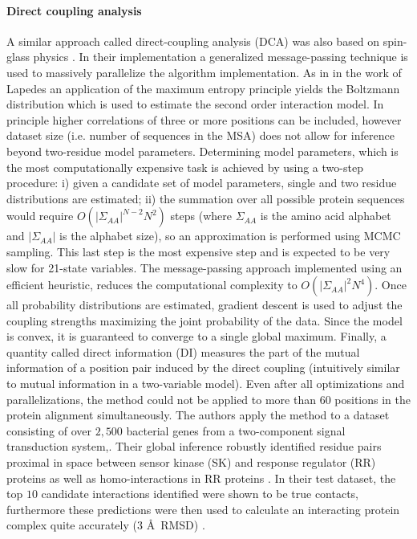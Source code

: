 \paragraph{Direct coupling analysis}
A similar approach called  direct-coupling analysis (DCA) was also based on spin-glass physics \cite{weigt2009identification}.
In their implementation a generalized message-passing technique is used to massively parallelize the algorithm implementation.
As in in the work of Lapedes \cite{lapedes2012using} an application of the maximum entropy principle yields the Boltzmann distribution which is used to estimate the second order interaction model.
In principle higher correlations of three or more positions can be included, however dataset size (i.e. number of sequences in the MSA) does not allow for inference beyond two-residue model parameters. 
Determining model parameters, which is the most computationally expensive task is achieved by using a two-step procedure: 
i) given a candidate set of model parameters, single and two residue distributions are estimated; 
ii) the summation over all possible protein sequences would require $O(|\Sigma_{AA}|^{N-2} N^2)$ steps (where $\Sigma_{AA}$ is the amino acid alphabet and $|\Sigma_{AA}|$ is the alphabet size), so an approximation is performed using MCMC sampling. 
This last step is the most expensive step and is expected to be very slow for 21-state variables.
The message-passing approach implemented using an efficient heuristic, reduces the computational complexity to $O(|\Sigma_{AA}|^2 N^4)$.
Once all probability distributions are estimated, gradient descent is used to adjust the coupling strengths maximizing the joint probability of the data.
Since the model is convex, it is guaranteed to converge to a single global maximum.
Finally, a quantity called direct information (DI) measures the part of the mutual information of a position pair induced by the direct coupling (intuitively similar to mutual information in a two-variable model).
Even after all optimizations and parallelizations, the method could not be applied to more than $60$ positions in the protein alignment simultaneously.
The authors apply the method to a dataset consisting of over $2,500$ bacterial genes from a two-component signal transduction system,. Their global inference robustly identified residue pairs proximal in space between sensor kinase (SK) and response regulator (RR) proteins as well as homo-interactions in RR proteins \cite{weigt2009identification}.
In their test dataset, the top $10$ candidate interactions identified were shown to be true contacts, furthermore these predictions were then used to calculate an interacting protein complex quite accurately (3 \AA\  RMSD) \cite{weigt2009identification}.

